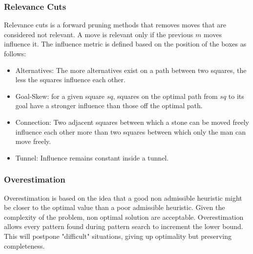 \subsubsection*{Relevance Cuts}
Relevance cuts is a forward pruning methods that removes moves that are considered not relevant. A move is relevant only if the previous $m$ moves influence it. The influence metric is defined based on the position of the boxes as follows:
\begin{itemize}
    \item Alternatives: The more alternatives exist on a path between two squares, the less the squares influence each other.
    \item Goal-Skew: for a given square $sq$, squares on the optimal path from $sq$ to its goal have a stronger influence than those off the optimal path.
    \item Connection: Two adjacent squares between which a stone can be moved freely influence each other more than two squares between which only the man can move freely.
    \item Tunnel: Influence remains constant inside a tunnel.
\end{itemize}

\subsubsection*{Overestimation}
Overestimation is based on the idea that a good non admissible heuristic might be closer to the optimal value than a poor admissible heuristic. Given the complexity of the problem, non optimal solution are acceptable. Overestimation allows every pattern found during pattern search to increment the lower bound. This will postpone "difficult" situations, giving up optimality but preserving completeness.